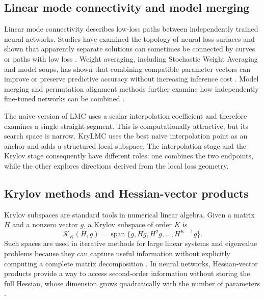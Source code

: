 \documentclass[11pt,a4paper]{article}
\newcommand{\Krylov}{\mathcal{K}}
\begin{document}
\subsection{Linear mode connectivity and model merging}
Linear mode connectivity describes low-loss paths between independently trained neural networks. Studies have examined the topology of neural loss surfaces and shown that apparently separate solutions can sometimes be connected by curves or paths with low loss \cite{garipov2018loss,draxler2018barriers,frankle2020linear}. Weight averaging, including Stochastic Weight Averaging and model soups, has shown that combining compatible parameter vectors can improve or preserve predictive accuracy without increasing inference cost \cite{izmailov2018swa,wortsman2022soups}. Model merging and permutation alignment methods further examine how independently fine-tuned networks can be combined \cite{ainsworth2023git,entezari2022permutation,ilharco2023taskarithmetic}.

The naive version of LMC uses a scalar interpolation coefficient and therefore examines a single straight segment. This is computationally attractive, but its search space is narrow. KryLMC uses the best naive interpolation point as an anchor and adds a structured local subspace. The interpolation stage and the Krylov stage consequently have different roles: one combines the two endpoints, while the other explores directions derived from the local loss geometry.

\subsection{Krylov methods and Hessian-vector products}
Krylov subspaces are standard tools in numerical linear algebra. Given a matrix $H$ and a nonzero vector $g$, a Krylov subspace of order $K$ is
\begin{equation}
 \Krylov_K(H,g)=\operatorname{span}\{g,Hg,H^2g,\ldots,H^{K-1}g\}.
 \label{eq:krylov_general}
\end{equation}
Such spaces are used in iterative methods for large linear systems and eigenvalue problems because they can capture useful information without explicitly computing a complete matrix decomposition \cite{saad2003iterative,liesen2013krylov}. In neural networks, Hessian-vector products provide a way to access second-order information without storing the full Hessian, whose dimension grows quadratically with the number of parameters \cite{pearlmutter1994hessian,martens2010hessianfree}.
\end{document}
